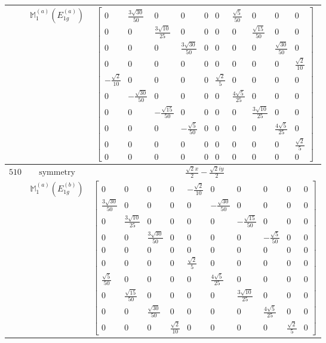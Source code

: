 \documentclass[fleqn,8pt,landscape]{jsarticle}
\begin{document}
\begin{longtable}{ccc}
$  $ & $ \mathbb{M}_{1}^{(a)}(E_{1g}^{(a)}) $ & $ \begin{bmatrix} 0 & \frac{3 \sqrt{30}}{50} & 0 & 0 & 0 & 0 & \frac{\sqrt{5}}{50} & 0 & 0 & 0 \\ 0 & 0 & \frac{3 \sqrt{10}}{25} & 0 & 0 & 0 & 0 & \frac{\sqrt{15}}{50} & 0 & 0 \\ 0 & 0 & 0 & \frac{3 \sqrt{30}}{50} & 0 & 0 & 0 & 0 & \frac{\sqrt{30}}{50} & 0 \\ 0 & 0 & 0 & 0 & 0 & 0 & 0 & 0 & 0 & \frac{\sqrt{2}}{10} \\ - \frac{\sqrt{2}}{10} & 0 & 0 & 0 & 0 & \frac{\sqrt{2}}{5} & 0 & 0 & 0 & 0 \\ 0 & - \frac{\sqrt{30}}{50} & 0 & 0 & 0 & 0 & \frac{4 \sqrt{5}}{25} & 0 & 0 & 0 \\ 0 & 0 & - \frac{\sqrt{15}}{50} & 0 & 0 & 0 & 0 & \frac{3 \sqrt{10}}{25} & 0 & 0 \\ 0 & 0 & 0 & - \frac{\sqrt{5}}{50} & 0 & 0 & 0 & 0 & \frac{4 \sqrt{5}}{25} & 0 \\ 0 & 0 & 0 & 0 & 0 & 0 & 0 & 0 & 0 & \frac{\sqrt{2}}{5} \\ 0 & 0 & 0 & 0 & 0 & 0 & 0 & 0 & 0 & 0 \end{bmatrix} $ \\ \hline
$ 510 $ & $ \text{symmetry} $ & $ \frac{\sqrt{2} x}{2} - \frac{\sqrt{2} i y}{2} $ \\
$  $ & $ \mathbb{M}_{1}^{(a)}(E_{1g}^{(b)}) $ & $ \begin{bmatrix} 0 & 0 & 0 & 0 & - \frac{\sqrt{2}}{10} & 0 & 0 & 0 & 0 & 0 \\ \frac{3 \sqrt{30}}{50} & 0 & 0 & 0 & 0 & - \frac{\sqrt{30}}{50} & 0 & 0 & 0 & 0 \\ 0 & \frac{3 \sqrt{10}}{25} & 0 & 0 & 0 & 0 & - \frac{\sqrt{15}}{50} & 0 & 0 & 0 \\ 0 & 0 & \frac{3 \sqrt{30}}{50} & 0 & 0 & 0 & 0 & - \frac{\sqrt{5}}{50} & 0 & 0 \\ 0 & 0 & 0 & 0 & 0 & 0 & 0 & 0 & 0 & 0 \\ 0 & 0 & 0 & 0 & \frac{\sqrt{2}}{5} & 0 & 0 & 0 & 0 & 0 \\ \frac{\sqrt{5}}{50} & 0 & 0 & 0 & 0 & \frac{4 \sqrt{5}}{25} & 0 & 0 & 0 & 0 \\ 0 & \frac{\sqrt{15}}{50} & 0 & 0 & 0 & 0 & \frac{3 \sqrt{10}}{25} & 0 & 0 & 0 \\ 0 & 0 & \frac{\sqrt{30}}{50} & 0 & 0 & 0 & 0 & \frac{4 \sqrt{5}}{25} & 0 & 0 \\ 0 & 0 & 0 & \frac{\sqrt{2}}{10} & 0 & 0 & 0 & 0 & \frac{\sqrt{2}}{5} & 0 \end{bmatrix} $ \\ \hline

\end{longtable}
\end{document}
